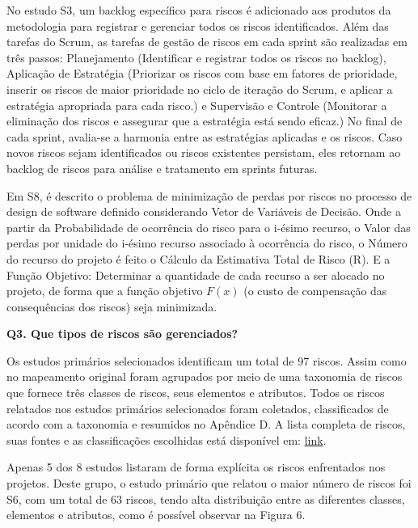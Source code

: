 \documentclass[
	12pt,
	openright,
	twoside,
	a4paper,
	english,
	brazil
	]{abntex2}
\begin{document}
No estudo S3, um backlog específico para riscos é adicionado aos produtos da metodologia para registrar e gerenciar todos os riscos identificados. Além das tarefas do Scrum, as tarefas de gestão de riscos em cada sprint são realizadas em três passos: Planejamento (Identificar e registrar todos os riscos no backlog), Aplicação de Estratégia (Priorizar os riscos com base em fatores de prioridade, inserir os riscos de maior prioridade no ciclo de iteração do Scrum, e aplicar a estratégia apropriada para cada risco.) e Supervisão e Controle (Monitorar a eliminação dos riscos e assegurar que a estratégia está sendo eficaz.) No final de cada sprint, avalia-se a harmonia entre as estratégias aplicadas e os riscos. Caso novos riscos sejam identificados ou riscos existentes persistam, eles retornam ao backlog de riscos para análise e tratamento em sprints futuras.

Em S8, é descrito o problema de minimização de perdas por riscos no processo de design de software definido considerando Vetor de Variáveis de Decisão. Onde a partir da Probabilidade de ocorrência do risco para o i-ésimo recurso, o Valor das perdas por unidade do i-ésimo recurso associado à ocorrência do risco, o Número do recurso do projeto é feito o Cálculo da Estimativa Total de Risco (R). E a Função Objetivo: Determinar a quantidade de cada recurso a ser alocado no projeto, de forma que a função objetivo  \( F(x) \) (o custo de compensação das consequências dos riscos) seja minimizada.

\textbf{Q3. Que tipos de riscos são gerenciados?}

Os estudos primários selecionados identificam um total de 97 riscos. Assim como no mapeamento original foram agrupados por meio de uma taxonomia de riscos que fornece três classes de riscos, seus elementos e atributos. Todos os riscos relatados nos estudos primários selecionados foram coletados, classificados de acordo com a taxonomia e resumidos no Apêndice D. A lista completa de riscos, suas fontes e as classificações escolhidas está disponível em: \href{https://docs.google.com/spreadsheets/d/1YY_yjyBefJ3ZmnEY38TM_LnZLoJcKhrw_q0BdEvqx2E/edit?usp=drivesdk}{link}.

Apenas 5 dos 8 estudos listaram de forma explícita os riscos enfrentados nos projetos. Deste grupo, o estudo primário que relatou o maior número de riscos foi S6, com um total de 63 riscos, tendo alta distribuição entre as diferentes classes, elementos e atributos, como é possível observar na Figura 6.
\end{document}
